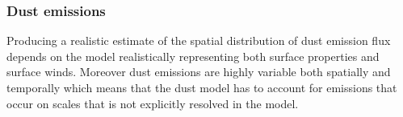 
\subsubsection{Dust emissions}\label{sec:dust_emission_modelling}
Producing a realistic estimate of the spatial distribution of dust emission flux depends on the model realistically  representing both surface properties and surface winds. Moreover dust emissions are highly variable both spatially and temporally which means that the dust model has to account for emissions that occur on scales that is not explicitly resolved in the model.        

